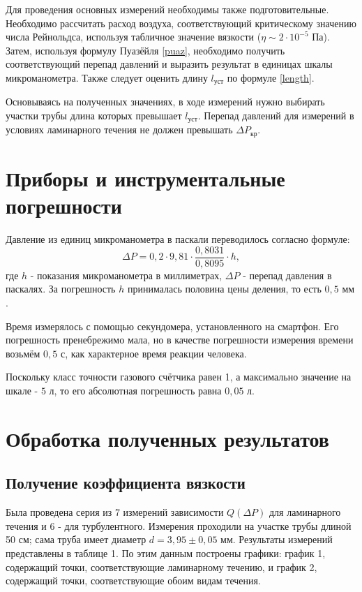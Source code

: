 \documentclass[15pt,a5paper,reqno]{article}
\begin{document}
    Для проведения основных измерений необходимы также подготовительные. Необходимо рассчитать расход воздуха, соответствующий критическому значению числа Рейнольдса, используя табличное значение вязкости ($\eta \sim 2\cdot 10^{-5}\text{ Па}$). Затем, используя формулу Пуазёйля \eqref{puaz}, необходимо получить соответствующий перепад давлений и выразить результат в единицах шкалы микроманометра. Также следует оценить длину $l_{\text{уст}}$ по формуле \eqref{length}.
    
    Основываясь на полученных значениях, в ходе измерений нужно выбирать участки трубы длина которых превышает $l_{\text{уст}}$. Перепад давлений для измерений в условиях ламинарного течения не должен превышать $\Delta P_{\text{кр}}$.
    
\section{Приборы и инструментальные погрешности}

    Давление из единиц микроманометра в паскали переводилось согласно формуле:
    \[\Delta P = 0,2\cdot9,81\cdot\frac{0,8031}{0,8095}\cdot h,\]
    где $h$ - показания микроманометра в миллиметрах, $\Delta P$ - перепад давления в паскалях. За погрешность $h$ принималась половина цены деления, то есть $0,5\text{ мм}$.
    
    Время измерялось с помощью секундомера, установленного на смартфон. Его погрешность пренебрежимо мала, но в качестве погрешности измерения времени возьмём $0,5\text{ с}$, как характерное время реакции человека.
    
    Поскольку класс точности газового счётчика равен 1, а максимально значение на шкале - $5\text{ л}$, то его абсолютная погрешность равна $0,05\text{ л}$. 

\section{Обработка полученных результатов}

    \subsection{Получение коэффициента вязкости}
    Была проведена серия из 7 измерений зависимости $Q(\Delta P)$ для ламинарного течения и 6 - для турбулентного. Измерения проходили на участке трубы длиной 50 см; сама труба имеет диаметр $d = 3,95 \pm 0,05\text{ мм}$. Результаты измерений представлены в таблице 1. По этим данным построены графики: график 1, содержащий точки, соответствующие ламинарному течению, и график 2, содержащий точки, соответствующие обоим видам течения.
    
\end{document}
